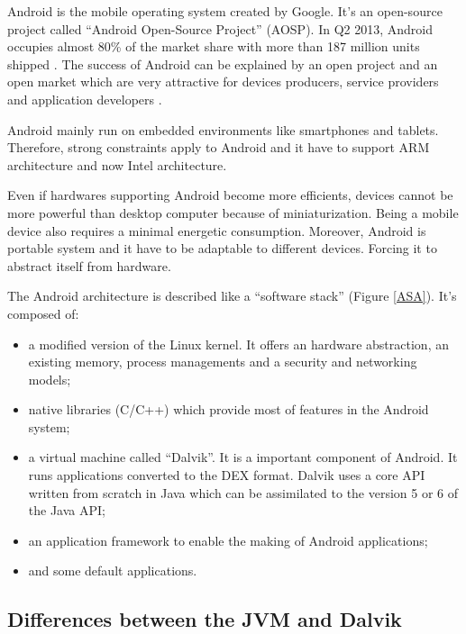 \documentclass{sig-alternate}
\def \DALVIK{Dalvik\xspace}
\def \ANDROID{Android\xspace}
\def \DEX{DEX\xspace}
\begin{document}
    \ANDROID is the mobile operating system created by Google.
    It's an open-source project called ``\ANDROID Open-Source Project'' (AOSP).
    In Q2 2013, \ANDROID occupies almost 80\% of the market share with more than 187 million units shipped \cite{idc-website}.
    The success of \ANDROID can be explained by an open project and an open market
    which are very attractive for devices producers, service providers and application developers \cite{ieee-butler-android-landscape}.

    \ANDROID mainly run on embedded environments like smartphones and tablets.
    Therefore, strong constraints apply to \ANDROID
    and it have to support ARM architecture and now Intel architecture.
    
    Even if hardwares supporting \ANDROID become more efficients,
    devices cannot be more powerful than desktop computer because of miniaturization.
    Being a mobile device also requires a minimal energetic consumption.
    Moreover, \ANDROID is portable system and it have to be adaptable to different devices.
    Forcing it to abstract itself from hardware.

    The \ANDROID architecture is described like a ``software stack'' (Figure \ref{ASA}).
    It's composed of:
    \begin{itemize}
      \item a modified version of the Linux kernel.
        It offers an hardware abstraction, an existing memory, process managements and a security and networking models;
      \item native libraries (C/C++)
        which provide most of features in the \ANDROID system;
      \item a virtual machine called ``\DALVIK''.
        It is a important component of \ANDROID.
        It runs applications converted to the \DEX format.
        \DALVIK uses a core API written from scratch in Java
        which can be assimilated to the version 5 or 6 of the Java API;
      \item an application framework to enable the making of \ANDROID applications;
      \item and some default applications.
    \end{itemize}

    \subsection{Differences between the JVM and \DALVIK}
\end{document}
